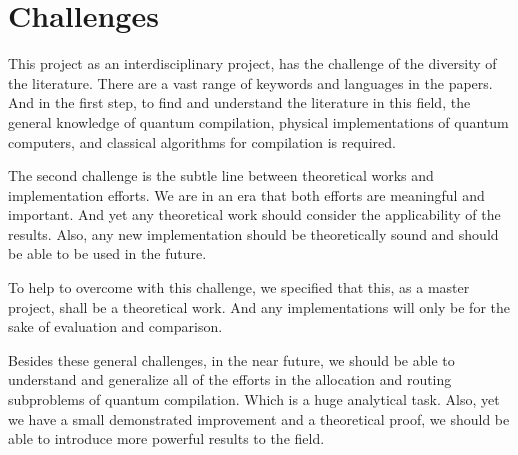 \documentclass{article}
\begin{document}
\section{Challenges}

This project as an interdisciplinary project, has the challenge of the diversity of the literature. There are a vast range of keywords and languages in the papers. 
And in the first step, to find and understand the literature in this field, the general knowledge of quantum compilation, physical implementations of quantum computers, and classical algorithms for compilation is required.

The second challenge is the subtle line between theoretical works and implementation efforts. We are in an era that both efforts are meaningful and important. And yet any theoretical work should consider the applicability of the results. Also, any new implementation should be theoretically sound and should be able to be used in the future.

To help to overcome with this challenge, we specified that this, as a master project, shall be a theoretical work. And any implementations will only be for the sake of evaluation and comparison.

Besides these general challenges,
in the near future, we should be able to understand and generalize all of the efforts in the allocation and routing subproblems of quantum compilation. Which is a huge analytical task. Also, yet we have a small demonstrated improvement and a theoretical proof, we should be able to introduce more powerful results to the field.
\end{document}
